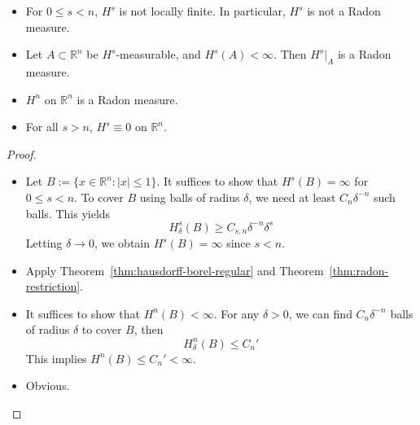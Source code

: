     \begin{theorem}\label{thm:hausdorff-radon-properties}
        \begin{itemize}
            \item[(i)] For $0\leq s<n$, $H^{s}$ is not locally finite. In particular, $H^{s}$ is not a Radon measure.
            \item[(ii)] Let $A \subset \mathbb{R}^{n}$ be $H^{s}$-measurable, and $H^{s}(A)<\infty$. Then $H^{s}|_{A}$ is a Radon measure.
            \item[(iii)] $H^{n}$ on $\mathbb{R}^{n}$ is a Radon measure.
            \item[(iv)] For all $s>n$, $H^{s}\equiv 0$ on $\mathbb{R}^{n}$.
        \end{itemize}
    \end{theorem}
    \begin{proof}
        \begin{itemize}
            \item[(i)] Let $B:=\{ x \in \mathbb{R}^{n}: |x|\leq1 \}$. It suffices to show that $H^{s}(B)=\infty$ for $0\leq s<n$. To cover $B$ using balls of radius $\delta$, we need at least $C_{n}\delta ^{-n}$ such balls. This yields
            \[
            H_{\delta}^{s}(B)\geq C_{s,n}\delta ^{-n}\delta ^{s}
            \]
            Letting $\delta\to 0$, we obtain $H^{s}(B)=\infty$ since $s<n$.
            \item[(ii)] Apply Theorem~\ref{thm:hausdorff-borel-regular} and Theorem~\ref{thm:radon-restriction}.
            \item[(iii)] It suffices to show that $H^{n}(B)<\infty$. For any $\delta>0$, we can find $C_{n}\delta ^{-n}$ balls of radius $\delta$ to cover $B$, then
            \[
            H^{n}_{\delta}(B)\leq C_{n}'
            \]
            This implies $H^{n}(B)\leq C_{n}'<\infty$.
            \item[(iv)] Obvious.\qedhere
        \end{itemize}
    \end{proof}

